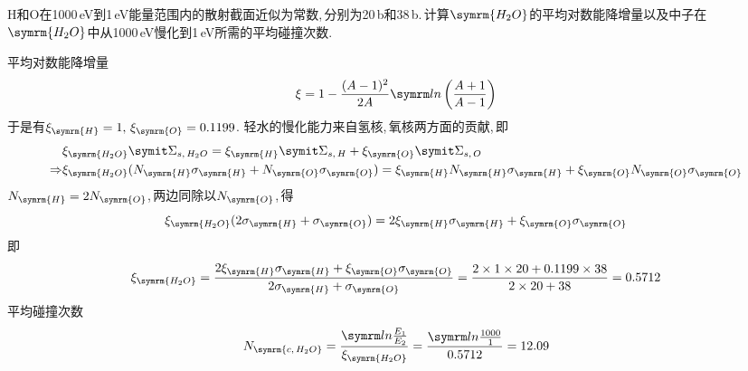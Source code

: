 \begin{exercise}
    H和O在1000\,eV到1\,eV能量范围内的散射截面近似为常数,\,分别为20\,b和38\,b.\,计算$\symrm{H_2O}$的平均对数能降增量以及中子在$\symrm{H_2O}$中从1000\,eV慢化到1\,eV所需的平均碰撞次数.\,
    \begin{solution}
        平均对数能降增量
        \begin{equation*}
            \xi = 1 - \frac{(A-1)^2}{2A}\loge\left(\frac{A+1}{A-1}\right)
        \end{equation*}
        于是有$\xi_{\symrm{H}}=1,\,\xi_{\symrm{O}}=0.1199$.
        轻水的慢化能力来自氢核,\,氧核两方面的贡献,\,即
        \begin{align*}
            &\xi_{\symrm{H_2O}}\vSigma_{s,\,H_2O} = \xi_{\symrm{H}}\vSigma_{s,\,H} + \xi_{\symrm{O}}\vSigma_{s,\,O} \\
            \Rightarrow & \xi_{\symrm{H_2O}}(N_{\symrm{H}}\sigma_{\symrm{H}} + N_{\symrm{O}}\sigma_{\symrm{O}}) = \xi_{\symrm{H}}N_{\symrm{H}}\sigma_{\symrm{H}} + \xi_{\symrm{O}}N_{\symrm{O}}\sigma_{\symrm{O}}
        \end{align*}
        $N_{\symrm{H}}=2N_{\symrm{O}}$,\,两边同除以$N_{\symrm{O}}$,\,得
        \begin{equation*}
            \xi_{\symrm{H_2O}}(2\sigma_{\symrm{H}} + \sigma_{\symrm{O}}) = 2\xi_{\symrm{H}}\sigma_{\symrm{H}} + \xi_{\symrm{O}}\sigma_{\symrm{O}}
        \end{equation*}
        即
        \begin{equation*}
            \xi_{\symrm{H_2O}} = \frac{2\xi_{\symrm{H}}\sigma_{\symrm{H}} + \xi_{\symrm{O}}\sigma_{\symrm{O}}}{2\sigma_{\symrm{H}} + \sigma_{\symrm{O}}} = \frac{2\times 1\times 20 + 0.1199\times 38}{2\times 20 + 38} = 0.5712
        \end{equation*}
        平均碰撞次数
        \begin{equation*}
            N_{\symrm{c,\,H_2O}} = \frac{\loge \frac{E_1}{E_2}}{\xi_{\symrm{H_2O}}} = \frac{\loge \frac{1000}{1}}{0.5712} = 12.09
        \end{equation*}
    \end{solution}
\end{exercise}